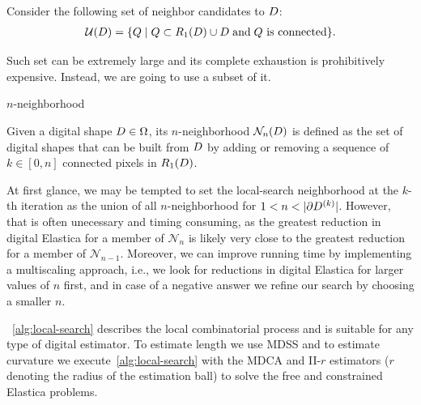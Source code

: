 Consider the following set of neighbor candidates to $D$:
\begin{align*}
\mathcal{U}(D) = \{ Q \; | \; Q \subset R_1(D) \cup D \; \text{and} \; \text{$Q$ is connected} \}.
\end{align*}


Such set can be extremely large and its complete exhaustion is prohibitively expensive.  Instead, we are going to use a subset of it.


\begin{definition}{$n$-neighborhood}

	Given a digital shape $D \in \Omega$, its $n$-neigh\-bor\-hood $\mathcal{N}_n(D)$ is defined as the set of digital shapes that can be built from $D$ by adding or removing a sequence of $k \in [0,n]$ connected pixels in $R_1(D)$.

\end{definition}



At first glance, we may be tempted to set the local-search neighborhood at the $k$-th iteration as the union of all $n$-neighborhood for $1<n<|\partial \Ds^{(k)}|$. However, that is often unecessary and timing consuming, as the greatest reduction in digital Elastica for a member of $\mathcal{N}_n$ is likely very close to the greatest reduction for a member of $\mathcal{N}_{n-1}$. Moreover, we can improve running time by implementing a multiscaling approach, i.e., we look for reductions in digital Elastica for larger values of $n$ first, and in case of a negative answer we refine our search by choosing a smaller $n$.

~\cref{alg:local-search} describes the local combinatorial process and is suitable for any type of digital estimator. To estimate length we use MDSS and to estimate curvature we execute~\cref{alg:local-search} with the MDCA and II-$r$ estimators ($r$ denoting the radius of the estimation ball) to solve the free and constrained Elastica problems. 
	

